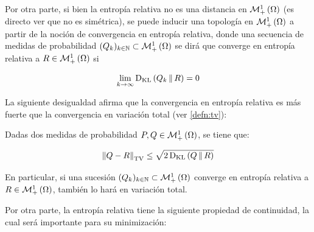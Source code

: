 





Por otra parte, si bien la entropía relativa no es una distancia en $\mathcal{M}_+^1\left(\Omega\right)$ (es directo ver que no es simétrica), se puede inducir una topología en $\mathcal{M}_+^1\left(\Omega\right)$ a partir de la noción de convergencia en entropía relativa, donde una secuencia de medidas de probabilidad $(Q_k)_{k\in\mathbb{N}}\subset \mathcal{M}_+^1\left(\Omega\right)$ se dirá que converge en entropía relativa a $R\in\mathcal{M}_+^1\left(\Omega\right)$ si

\begin{equation}
	\lim_{k\to\infty} \operatorname{D_{KL}}\left(Q_k\,\|\,R\right) = 0
\end{equation}

La siguiente desigualdad afirma que la convergencia en entropía relativa es más fuerte que la convergencia en variación total (ver \autoref{defn:tv}):

\begin{teo}
	Dadas dos medidas de probabilidad $P,Q\in\mathcal{M}_+^1\left(\Omega\right)$, se tiene que:

	\begin{equation}
		\left\lVert Q-R \right\rVert_{\operatorname{TV}} \leq \sqrt{2\operatorname{D_{KL}}\left(Q\,\|\,R\right)}
	\end{equation}

	En particular, si una sucesión $(Q_k)_{k\in\mathbb{N}}\subset \mathcal{M}_+^1\left(\Omega\right)$ converge en entropía relativa a $R\in\mathcal{M}_+^1\left(\Omega\right)$, también lo hará en variación total.
\end{teo}

Por otra parte, la entropía relativa tiene la siguiente propiedad de continuidad, la cual será importante para su minimización:

